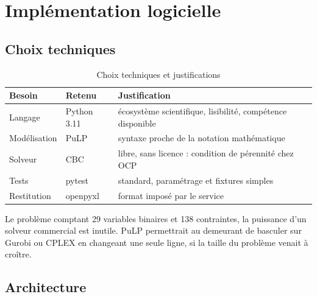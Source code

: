 \chapter{Implémentation logicielle}
\label{chap:implementation}

\section{Choix techniques}

\begin{table}[H]
\centering
\caption{Choix techniques et justifications}
\label{tab:choix-techniques}
\begin{tabular}{@{}llp{7cm}@{}}
\toprule
\textbf{Besoin} & \textbf{Retenu} & \textbf{Justification} \\
\midrule
Langage & Python 3.11 & écosystème scientifique, lisibilité, compétence disponible \\
Modélisation & PuLP & syntaxe proche de la notation mathématique \\
Solveur & CBC & libre, sans licence : condition de pérennité chez OCP \\
Tests & pytest & standard, paramétrage et fixtures simples \\
Restitution & openpyxl & format imposé par le service \\
\bottomrule
\end{tabular}
\end{table}

Le problème comptant \num{29} variables binaires et \num{138} contraintes, la puissance d'un
solveur commercial est inutile. PuLP permettrait au demeurant de basculer sur Gurobi ou
CPLEX en changeant une seule ligne, si la taille du problème venait à croître.

\section{Architecture}

